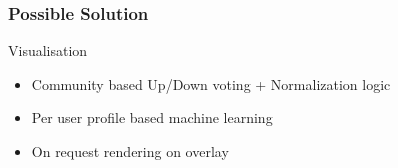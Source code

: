 \begin{frame}
	\frametitle{Possible Solution}
	\begin{block}{Visualisation}
		\begin{itemize}
			\item Community based Up/Down voting + Normalization logic
			\item Per user profile based machine learning
			\item On request rendering on overlay
		\end{itemize}
	\end{block}
\end{frame}
